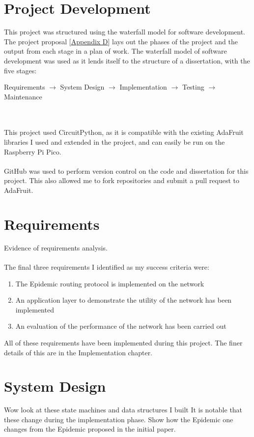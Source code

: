 \documentclass[12pt,a4paper]{report}
\begin{document}
\section{Project Development} 
This project was structured using the waterfall model for software development. The project proposal [\hyperref[appendixD]{Appendix D}] lays out the phases of the project and the output from each stage in a plan of work. The waterfall model of software development was used as it lends itself to the structure of a dissertation, with the five stages: \\
\centerline{Requirements $\rightarrow$ System Design $\rightarrow$ Implementation $\rightarrow$ Testing $\rightarrow$ Maintenance} \\ \\
This project used CircuitPython, as it is compatible with the existing AdaFruit libraries I used and extended in the project, and can easily be run on the Raspberry Pi Pico. \\ \\
GitHub was used to perform version control on the code and dissertation for this project. This also allowed me to fork repositories and submit a pull request to AdaFruit.

\section{Requirements}
Evidence of requirements analysis. \\ \\
The final three requirements I identified as my success criteria were:
\begin{enumerate}
\item The Epidemic routing protocol is implemented on the network 
\item An application layer to demonstrate the utility of the network has been implemented
\item An evaluation of the performance of the network has been carried out
\end{enumerate}
All of these requirements have been implemented during this project. The finer details of this are in the Implementation chapter. 

\section{System Design}
Wow look at these state machines and data structures I built It is notable that these change during the implementation phase. Show how the Epidemic one changes from the Epidemic proposed in the initial paper.
\end{document}
